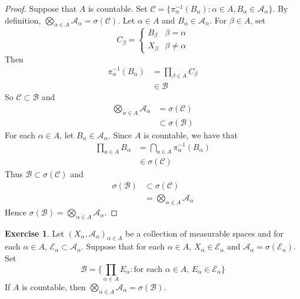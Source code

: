 \documentclass[12pt]{amsart}
\theoremstyle{definition}
\newtheorem{ex}[definition]{Exercise}
\newcommand{\al}{\alpha}
\newcommand{\be}{\beta}
\newcommand{\sig}{\sigma}
\newcommand{\MA}{\mathcal{A}}
\newcommand{\MC}{\mathcal{C}}
\newcommand{\MB}{\mathcal{B}}
\newcommand{\ME}{\mathcal{E}}
\begin{document}
 	\begin{proof}
 		Suppose that $A$ is countable. Set $\MC = \{\pi_{\al}^{-1}(B_{\al}): \al \in A, B_{\al} \in \MA_{\al}\}$. By definition, $\bigotimes\limits_{\al \in A} \MA_{\al} = \sig(\MC)$. Let $\al \in A$ and $B_{\al} \in \MA_{\al}$. For $\be \in A$, set 
 		\[
 		C_{\be} = 
 		\begin{cases}
 			B_{\be} & \be = \al \\
 			X_{\be} & \be \neq \al
 		\end{cases}
 		\]
 		Then 
 		\begin{align*}
 			\pi_{\al}^{-1}(B_{\al}) 
 			& = \prod_{\be \in A} C_{\be} \\
 			& \in \MB
 		\end{align*}
 		So $\MC \subset \MB$ and 
 		\begin{align*}
 			\bigotimes\limits_{\al \in A} \MA_{\al}
 			& = \sig(\MC) \\
 			& \subset \sig(\MB)
 		\end{align*}
 		For each $\al \in A$, let $B_{\al} \in \MA_{\al}$. Since $A$ is countable, we have that 
 		\begin{align*}
 			\prod_{a \in A} B_{\al} 
 			& = \bigcap_{a \in A} \pi_{\al}^{-1}(B_{\al}) \\
 			& \in \sig(\MC) 
 		\end{align*}
 		Thus $\MB \subset \sig(\MC)$ and 
 		\begin{align*}
 			\sig(\MB) 
 			& \subset \sig(\MC) \\
 			& = \bigotimes\limits_{\al \in A} \MA_{\al}
 		\end{align*}
 		Hence $\sig(\MB) = \bigotimes\limits_{\al \in A} \MA_{\al}$. 
 	\end{proof}
 
 	\begin{ex}
 		Let $(X_{\al}, \MA_{\al})_{\al \in A}$ be a collection of measurable spaces and for each $\al \in A$, $\ME_{\al} \subset \MA_{\al}$. Suppose that for each $\al \in A$, $X_{\al} \in \ME_{\al}$ and $\MA_{\al} = \sig(\ME_{\al})$. Set 
 		$$\MB = \bigg \{ \prod\limits_{\al \in A} E_{\al}:  \text{for each $\al \in A$, } E_{\al} \in \ME_{\al} \bigg \}$$ 
 		If $A$ is countable, then $\bigotimes\limits_{\al \in A} \MA_{\al} = \sig(\MB)$.
 	\end{ex}
 
\end{document}
